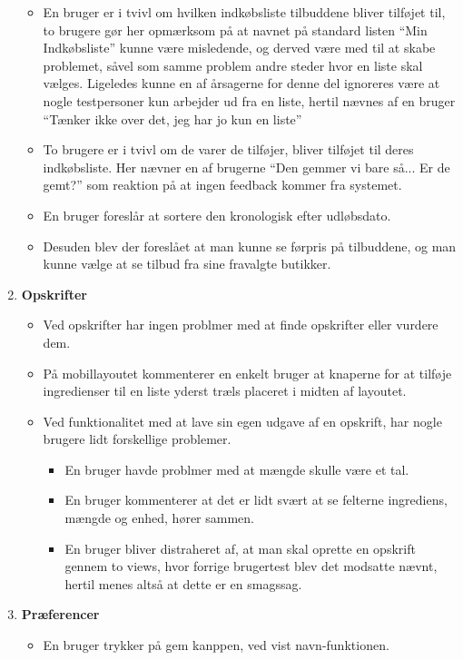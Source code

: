 \begin{enumerate}
\begin{itemize}
      \item En bruger er i tvivl om hvilken indkøbsliste tilbuddene bliver tilføjet til, to brugere gør her opmærksom på at navnet på standard listen ``Min Indkøbsliste'' kunne være misledende, og derved være med til at skabe problemet, såvel som samme problem andre steder hvor en liste skal vælges.
      Ligeledes kunne en af årsagerne for denne del ignoreres være at nogle testpersoner kun arbejder ud fra en liste, hertil nævnes af en bruger ``Tænker ikke over det, jeg har jo kun en liste''
      \item To brugere er i tvivl om de varer de tilføjer, bliver tilføjet til deres indkøbsliste.
      Her nævner en af brugerne ``Den gemmer vi bare så... Er de gemt?'' som reaktion på at ingen feedback kommer fra systemet.
      \item En bruger foreslår at sortere den kronologisk efter udløbsdato.
      \item Desuden blev der foreslået at man kunne se førpris på tilbuddene, og man kunne vælge at se tilbud fra sine fravalgte butikker.
   \end{itemize}
   \item \textbf{Opskrifter}
   \begin{itemize}
      \item Ved opskrifter har ingen problmer med at finde opskrifter eller vurdere dem.
      \item På mobillayoutet kommenterer en enkelt bruger at knaperne for at tilføje ingredienser til en liste yderst træls placeret i midten af layoutet.
      \item Ved funktionalitet med at lave sin egen udgave af en opskrift, har nogle brugere lidt forskellige problemer.
      \begin{itemize}
         \item En bruger havde problmer med at mængde skulle være et tal.
         \item En bruger kommenterer at det er lidt svært at se felterne ingrediens, mængde og enhed, hører sammen.
         \item En bruger bliver distraheret af, at man skal oprette en opskrift gennem to views, hvor forrige brugertest blev det modsatte nævnt, hertil menes altså at dette er en smagssag.
      \end{itemize} 
   \end{itemize}
   \item \textbf{Præferencer}
   \begin{itemize}
      \item En bruger  trykker på gem kanppen, ved vist navn-funktionen. 

\end{itemize}
\end{enumerate}
